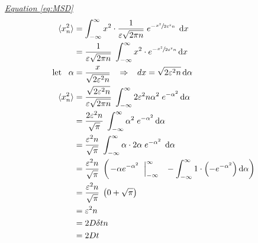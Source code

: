 \documentclass[a4paper, parskip=half]{scrartcl}
\newcommand{\diff}{\mathop{}\!\mathrm{d}}
\newcommand{\myEqRef}[1]{\textit{\hyperref[eq:#1]{Equation \ref*{eq:#1}}}}
\begin{document}
\myEqRef{MSD}
\begin{align}
\langle x_n^2\rangle &= \int_{-\infty}^\infty x^2 \cdot \frac{1}{\varepsilon\sqrt{2\pi n}}\; e^{-\sfrac{x^2}{2\varepsilon^2 n}}\; \diff x\\
&= \frac{1}{\varepsilon\sqrt{2\pi n}} \; \int_{-\infty}^\infty x^2 \cdot e^{-\sfrac{x^2}{2\varepsilon^2 n}} \diff x \\
\mathrm{let}\;\;\; \alpha &= \frac{x}{\sqrt{2\varepsilon^2n}} \;\;\; \Rightarrow \;\;\; dx = \sqrt{2\varepsilon^2n}\diff\alpha\\
\langle x_n^2\rangle &= \frac{\sqrt{2\varepsilon^2n}}{\varepsilon\sqrt{2\pi n}} \; \int_{-\infty}^\infty 2 \varepsilon^2n\alpha^2\; e^{-\alpha^2} \diff\alpha\\
&= \frac{2\varepsilon^2n}{\sqrt{\pi}} \; \int_{-\infty}^\infty \alpha^2\; e^{-\alpha^2} \diff \alpha\\
&= \frac{\varepsilon^2n}{\sqrt{\pi}} \; \int_{-\infty}^\infty \alpha \cdot 2\alpha\; e^{-\alpha^2}\; \diff\alpha\\
&= \frac{\varepsilon^2n}{\sqrt{\pi}} \; \left(\left.-\alpha e^{-\alpha^2}\;\; \right|_{-\infty}^\infty \;\;\; - \int_{-\infty}^\infty 1 \cdot \left(-e^{-\alpha^2} \right) \diff\alpha\right) \\
&= \frac{\varepsilon^2n}{\sqrt{\pi}} \; \left(0 + \sqrt{\pi} \right)\\
&= \varepsilon^2 n \\
&= 2 D \delta t n \\
&= 2 D t
\end{align}

\newpage
\printbibliography 
\end{document}
